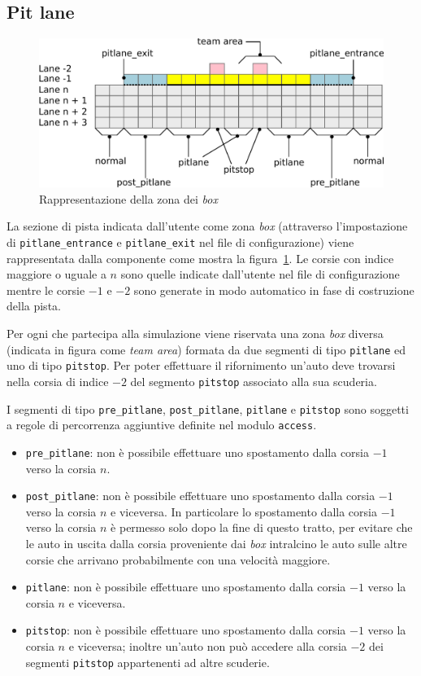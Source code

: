 \subsection{Pit lane}
\begin{figure}
\includegraphics[width=\textwidth]{diagrammi/PitLane}
\caption{Rappresentazione della zona dei \textit{box}}
\label{fig:pitLane}
\end{figure}

La sezione di pista indicata dall'utente come zona \textit{box} (attraverso l'impostazione di \texttt{pitlane\_entrance} e \texttt{pitlane\_exit} nel file di configurazione) viene rappresentata dalla componente \track{} come mostra la figura~\ref{fig:pitLane}. Le corsie con indice maggiore o uguale a $n$ sono quelle indicate dall'utente nel file di configurazione mentre le corsie $-1$ e $-2$ sono generate in modo automatico in fase di costruzione della pista.

Per ogni \team{} che partecipa alla simulazione viene riservata una zona \textit{box} diversa (indicata in figura come \textit{team area}) formata da due segmenti di tipo \texttt{pitlane} ed uno di tipo \texttt{pitstop}. Per poter effettuare il rifornimento un'auto deve trovarsi nella corsia di indice $-2$ del segmento \texttt{pitstop} associato alla sua scuderia.

I segmenti di tipo \texttt{pre\_pitlane}, \texttt{post\_pitlane}, \texttt{pitlane} e \texttt{pitstop} sono soggetti a regole di percorrenza aggiuntive definite nel modulo \texttt{access}.
\begin{itemize}
\item \texttt{pre\_pitlane}: non è possibile effettuare uno spostamento dalla corsia $-1$ verso la corsia $n$.
\item \texttt{post\_pitlane}: non è possibile effettuare uno spostamento dalla corsia $-1$ verso la corsia $n$ e viceversa. In particolare lo spostamento dalla corsia $-1$ verso la corsia $n$ è permesso solo dopo la fine di questo tratto, per evitare che le auto in uscita dalla corsia proveniente dai \textit{box} intralcino le auto sulle altre corsie che arrivano probabilmente con una velocità maggiore.
\item \texttt{pitlane}: non è possibile effettuare uno spostamento dalla corsia $-1$ verso la corsia $n$ e viceversa.
\item \texttt{pitstop}: non è possibile effettuare uno spostamento dalla corsia $-1$ verso la corsia $n$ e viceversa; inoltre un'auto non può accedere alla corsia $-2$ dei segmenti \texttt{pitstop} appartenenti ad altre scuderie.
\end{itemize}

